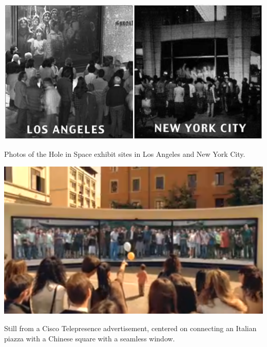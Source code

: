 \begin{marginfigure}
	\includegraphics{figures/hole_in_space.jpg}
	\caption{Photos of the Hole in Space exhibit sites in Los Angeles and New York City.}
	\label{fig:hole-in-space}
\end{marginfigure}

\begin{marginfigure}
	\includegraphics{figures/cisco-telepresence.png}
	\caption{Still from a Cisco Telepresence advertisement, centered on connecting an Italian piazza with a Chinese square with a seamless window.}
	\label{fig:cisco-telepresence}
\end{marginfigure}



